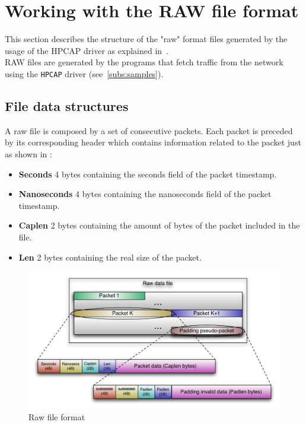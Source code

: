 \section{Working with the RAW file format}
\label{sec:raw}

This section describes the structure of the "raw" format files generated by the usage of the HPCAP driver as explained in~\cite{MorenoTFM2012}.\\

RAW files are generated by the programs that fetch traffic from the network using the \texttt{HPCAP} driver (see~\ref{subs:samples}).


\subsection{File data structures}

A raw file is composed by a set of consecutive packets.
Each packet is preceded by its corresponding header which contains information related to the packet just as shown in :

\begin{itemize}
	\item \textbf{Seconds} 4 bytes containing the seconds field of the packet timestamp.
	\item \textbf{Nanoseconds} 4 bytes containing the nanoseconds field of the packet timestamp.
	\item \textbf{Caplen} 2 bytes containing the amount of bytes of the packet included in the file.
	\item \textbf{Len} 2 bytes containing the real size of the packet.
\end{itemize}


\begin{figure}[h]
	\centering
	\begin{center}
		\includegraphics[angle=0,width=\textwidth]{figs/buff_raw2.pdf}
		\caption{Raw file format}
		\label{fig:rawformat}
	\end{center}
\end{figure}


